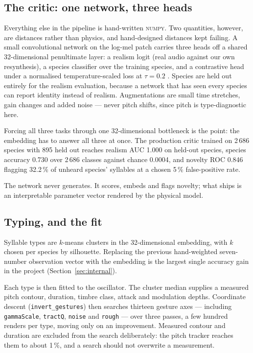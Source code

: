 \documentclass[10pt,twocolumn,a4paper]{article}
\begin{document}
\subsection{The critic: one network, three heads}

Everything else in the pipeline is hand-written \textsc{numpy}. Two quantities, however, are
distances rather than physics, and hand-designed distances kept failing. A small
convolutional network on the log-mel patch carries three heads off a shared 32-dimensional
penultimate layer: a realism logit (real audio against our own resynthesis), a species
classifier over the training species, and a contrastive head under a
normalised temperature-scaled loss at $\tau = 0.2$ \citep{simclr2020}. Species are held
out entirely for the realism evaluation, because a network that has seen every species can
report identity instead of realism. Augmentations are small time stretches, gain changes
and added noise --- never pitch shifts, since pitch is type-diagnostic here.

Forcing all three tasks through one 32-dimensional bottleneck is the point: the embedding
has to answer all three at once. The production critic trained on 2\,686 species with 895
held out reaches realism AUC 1.000 on held-out species, species accuracy 0.730 over 2\,686
classes against chance 0.0004, and novelty ROC 0.846 flagging 32.2\,\% of unheard species'
syllables at a chosen 5\,\% false-positive rate.

The network never generates. It scores, embeds and flags novelty; what ships is an
interpretable parameter vector rendered by the physical model.

\subsection{Typing, and the fit}

Syllable types are $k$-means clusters in the 32-dimensional embedding, with $k$ chosen per
species by silhouette. Replacing the previous hand-weighted seven-number observation vector
with the embedding is the largest single accuracy gain in the project
(Section~\ref{sec:internal}).

Each type is then fitted to the oscillator. The cluster median supplies a measured pitch
contour, duration, timbre class, attack and modulation depths. Coordinate descent
(\texttt{invert\_gestures}) then searches thirteen gesture axes --- including
\texttt{gammaScale}, \texttt{tractQ}, \texttt{noise} and \texttt{rough} --- over three
passes, a few hundred renders per type, moving only on an improvement. Measured contour and
duration are excluded from the search deliberately: the pitch tracker reaches them to about
1\,\%, and a search should not overwrite a measurement.
\end{document}

